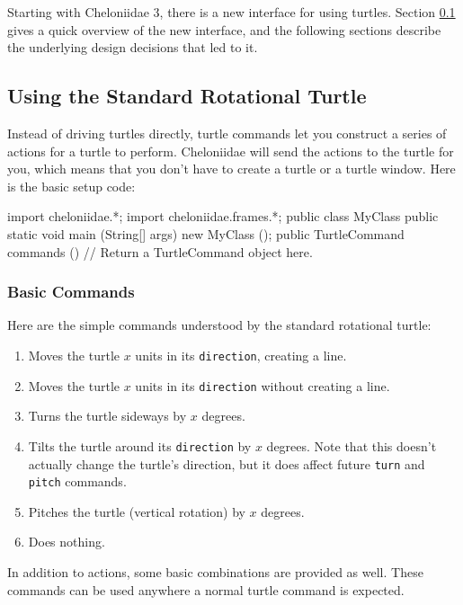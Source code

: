 \documentclass{article}
\def\command[#1]{\item[\tt #1]}
\begin{document}
    Starting with Cheloniidae 3, there is a new interface for using turtles. Section \ref{sec:using-the-standard-rotational-turtle} gives a quick overview of
    the new interface, and the following sections describe the underlying design decisions that led to it.

    \subsection{Using the Standard Rotational Turtle}
      \label{sec:using-the-standard-rotational-turtle}

      Instead of driving turtles directly, turtle commands let you construct a series of actions for a turtle to perform. Cheloniidae will send the actions to
      the turtle for you, which means that you don't have to create a turtle or a turtle window. Here is the basic setup code:

      \begin{java}
import cheloniidae.*;
import cheloniidae.frames.*;
public class MyClass {
  public static void main (String[] args) {new MyClass ();}
  public TurtleCommand commands () {
    // Return a TurtleCommand object here.
  }
}     \end{java}

      \subsubsection{Basic Commands}
        \label{sec:basic-commands}

        Here are the simple commands understood by the standard rotational turtle:

        \begin{enumerate}
          \command[move(x)]  Moves the turtle $x$ units in its {\tt direction}, creating a line.
          \command[jump(x)]  Moves the turtle $x$ units in its {\tt direction} without creating a line.
          \command[turn(x)]  Turns the turtle sideways by $x$ degrees.
          \command[bank(x)]  Tilts the turtle around its {\tt direction} by $x$ degrees. Note that this doesn't actually change the turtle's direction, but it
                             does affect future {\tt turn} and {\tt pitch} commands.
          \command[pitch(x)] Pitches the turtle (vertical rotation) by $x$ degrees.
          \command[pass()]   Does nothing.
        \end{enumerate}

        In addition to actions, some basic combinations are provided as well. These commands can be used anywhere a normal turtle command is expected.
\end{document}
